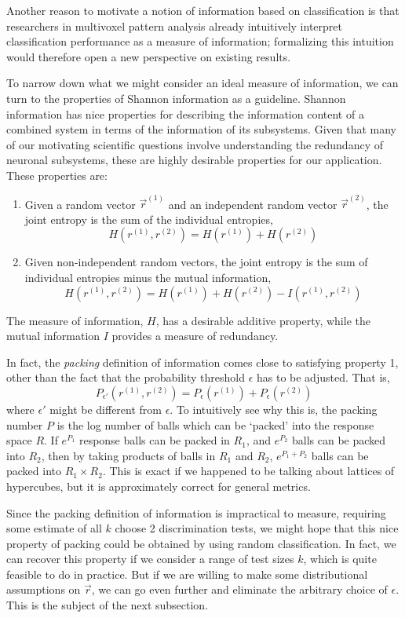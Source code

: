 \documentclass[12pt]{article}
\begin{document}
Another reason to motivate a notion of information based on
classification is that researchers in multivoxel pattern analysis
already intuitively interpret classification performance as a measure
of information; formalizing this intuition would therefore open a new
perspective on existing results.

To narrow down what we might consider an ideal measure of information,
we can turn to the properties of Shannon information as a guideline.
Shannon information has nice properties for describing the information
content of a combined system in terms of the information of its
subsystems.  Given that many of our motivating scientific questions
involve understanding the redundancy of neuronal subsystems, these are
highly desirable properties for our application.  These properties
are:
\begin{enumerate}
\item Given a random vector $\vec{r}^{(1)}$ and an independent random vector $\vec{r}^{(2)}$, the joint entropy is the sum of the individual entropies,
\[
H(r^{(1)}, r^{(2)}) = H(r^{(1)}) + H(r^{(2)})
\]
\item Given non-independent random vectors, the joint entropy is the sum of individual entropies minus the mutual information,
\[
H(r^{(1)}, r^{(2)}) = H(r^{(1)}) + H(r^{(2)}) - I(r^{(1)}, r^{(2)})
\]
\end{enumerate}
The measure of information, $H$, has a desirable additive property,
while the mutual information $I$ provides a measure of redundancy.

In fact, the \emph{packing} definition of information comes close to satisfying property 1, other than the fact that the probability threshold $\epsilon$ has to be adjusted.  That is,
\[
P_{\epsilon'}(r^{(1)}, r^{(2)}) = P_\epsilon(r^{(1)}) + P_\epsilon(r^{(2)})
\]
where $\epsilon'$ might be different from $\epsilon$.  To intuitively
see why this is, the packing number $P$ is the log number of balls
which can be `packed' into the response space $R$.  If $e^{P_1}$
response balls can be packed in $R_1$, and $e^{P_2}$ balls can be
packed into $R_2$, then by taking products of balls in $R_1$ and
$R_2$, $e^{P_1 + P_2}$ balls can be packed into $R_1 \times R_2$.
This is exact if we happened to be talking about lattices of
hypercubes, but it is approximately correct for general metrics.

Since the packing definition of information is impractical to measure,
requiring some estimate of all $k$ choose 2 discrimination tests, we
might hope that this nice property of packing could be obtained by
using random classification.  In fact, we can recover this property if
we consider a range of test sizes $k$, which is quite feasible to do
in practice.  But if we are willing to make some distributional
assumptions on $\vec{r}$, we can go even further and eliminate the
arbitrary choice of $\epsilon$.  This is the subject of the next
subsection.
\end{document}
